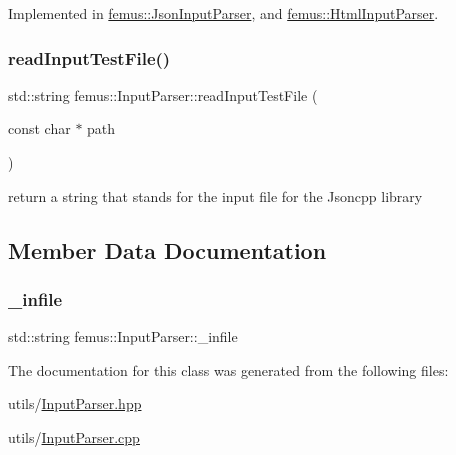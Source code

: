 Implemented in \mbox{\hyperlink{classfemus_1_1_json_input_parser_af6e86057aa2b4bc01fad78ff7340fbc6}{femus\+::\+Json\+Input\+Parser}}, and \mbox{\hyperlink{classfemus_1_1_html_input_parser_a53172b90136c6131ad3c97a92f3cf29a}{femus\+::\+Html\+Input\+Parser}}.

\mbox{\label{classfemus_1_1_input_parser_a7a8a5a9f57e14dd7669e53d14588f12a}} 
\subsubsection{\texorpdfstring{read\+Input\+Test\+File()}{readInputTestFile()}}
{\footnotesize\ttfamily std\+::string femus\+::\+Input\+Parser\+::read\+Input\+Test\+File (\begin{DoxyParamCaption}\item[{const char $\ast$}]{path }\end{DoxyParamCaption})\hspace{0.3cm}{\ttfamily [protected]}}

return a string that stands for the input file for the Jsoncpp library 

\subsection{Member Data Documentation}
\mbox{\label{classfemus_1_1_input_parser_aa20f2d4c97be18875f4ed70dca4e0881}} 
\subsubsection{\texorpdfstring{\+\_\+infile}{\_infile}}
{\footnotesize\ttfamily std\+::string femus\+::\+Input\+Parser\+::\+\_\+infile\hspace{0.3cm}{\ttfamily [protected]}}



The documentation for this class was generated from the following files\+:\begin{DoxyCompactItemize}
\item 
utils/\mbox{\hyperlink{_input_parser_8hpp}{Input\+Parser.\+hpp}}\item 
utils/\mbox{\hyperlink{_input_parser_8cpp}{Input\+Parser.\+cpp}}\end{DoxyCompactItemize}
